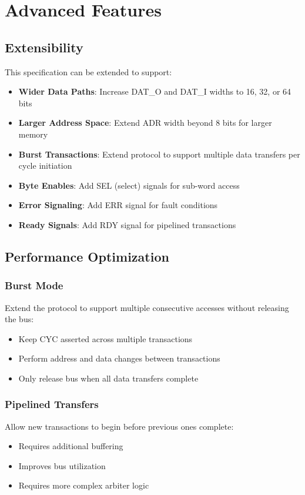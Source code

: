 \documentclass[12pt,a4paper]{article}
\begin{document}
\section{Advanced Features}

\subsection{Extensibility}

This specification can be extended to support:

\begin{itemize}
    \item \textbf{Wider Data Paths}: Increase DAT\_O and DAT\_I widths to 16, 32, or 64 bits
    \item \textbf{Larger Address Space}: Extend ADR width beyond 8 bits for larger memory
    \item \textbf{Burst Transactions}: Extend protocol to support multiple data transfers per cycle initiation
    \item \textbf{Byte Enables}: Add SEL (select) signals for sub-word access
    \item \textbf{Error Signaling}: Add ERR signal for fault conditions
    \item \textbf{Ready Signals}: Add RDY signal for pipelined transactions
\end{itemize}

\subsection{Performance Optimization}

\subsubsection{Burst Mode}
Extend the protocol to support multiple consecutive accesses without releasing the bus:
\begin{itemize}
    \item Keep CYC asserted across multiple transactions
    \item Perform address and data changes between transactions
    \item Only release bus when all data transfers complete
\end{itemize}

\subsubsection{Pipelined Transfers}
Allow new transactions to begin before previous ones complete:
\begin{itemize}
    \item Requires additional buffering
    \item Improves bus utilization
    \item Requires more complex arbiter logic
\end{itemize}
\end{document}

